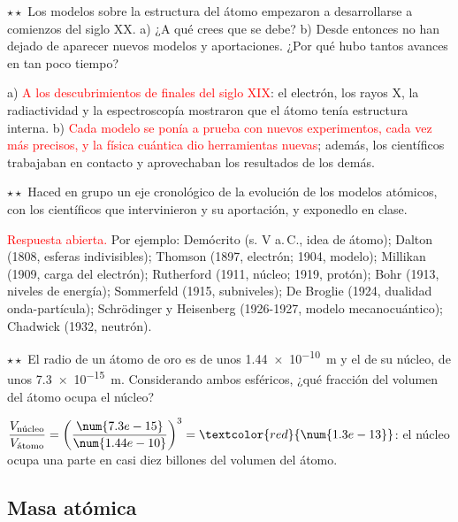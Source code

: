 \begin{exercise}
    \(\star\star\) Los modelos sobre la estructura del átomo empezaron a desarrollarse a comienzos del siglo XX. a) ¿A qué crees
    que se debe? b) Desde entonces no han dejado de aparecer nuevos modelos y aportaciones. ¿Por qué hubo tantos avances en tan
    poco tiempo?
    \begin{solu}
        a) \textcolor{red}{A los descubrimientos de finales del siglo XIX}: el electrón, los rayos X, la radiactividad y la
        espectroscopía mostraron que el átomo tenía estructura interna. b) \textcolor{red}{Cada modelo se ponía a prueba con nuevos
        experimentos, cada vez más precisos, y la física cuántica dio herramientas nuevas}; además, los científicos trabajaban en
        contacto y aprovechaban los resultados de los demás.
    \end{solu}
\end{exercise}

\begin{exercise}
    \(\star\star\) Haced en grupo un eje cronológico de la evolución de los modelos atómicos, con los científicos que intervinieron
    y su aportación, y exponedlo en clase.
    \begin{solu}
        \textcolor{red}{Respuesta abierta.} Por ejemplo: Demócrito (s. V a.\,C., idea de átomo); Dalton (1808, esferas
        indivisibles); Thomson (1897, electrón; 1904, modelo); Millikan (1909, carga del electrón); Rutherford (1911, núcleo;
        1919, protón); Bohr (1913, niveles de energía); Sommerfeld (1915, subniveles); De Broglie (1924, dualidad onda-partícula);
        Schrödinger y Heisenberg (1926-1927, modelo mecanocuántico); Chadwick (1932, neutrón).
    \end{solu}
\end{exercise}

\begin{exercise}
    \(\star\star\) El radio de un átomo de oro es de unos \qty{1.44e-10}{\m} y el de su núcleo, de unos \qty{7.3e-15}{\m}.
    Considerando ambos esféricos, ¿qué fracción del volumen del átomo ocupa el núcleo?
    \begin{solu}
        \(\dfrac{V_{\text{núcleo}}}{V_{\text{átomo}}} = \left( \dfrac{\num{7.3e-15}}{\num{1.44e-10}} \right)^3 =
        \textcolor{red}{\num{1.3e-13}}\): el núcleo ocupa una parte en casi diez billones del volumen del átomo.
    \end{solu}
\end{exercise}

\subsection{Masa atómica}

